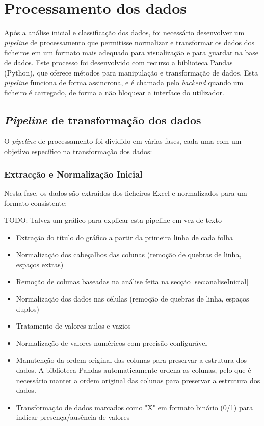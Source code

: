 \section{Processamento dos dados}

Após a análise inicial e classificação dos dados, foi necessário desenvolver um \textit{pipeline} de processamento que permitisse normalizar e transformar os dados dos ficheiros em um formato mais adequado para visualização e para guardar na base de dados. Este processo foi desenvolvido com recurso a biblioteca Pandas (Python), que oferece métodos para manipulação e transformação de dados. Esta \textit{pipeline} funciona de forma assincrona, e é chamada pelo \textit{backend} quando um ficheiro é carregado, de forma a não bloquear a interface do utilizador.

\subsection{\textit{Pipeline} de transformação dos dados}

O \textit{pipeline} de processamento foi dividido em várias fases, cada uma com um objetivo específico na transformação dos dados:

\subsubsection{Extracção e Normalização Inicial}

Nesta fase, os dados são extraídos dos ficheiros Excel e normalizados para um formato consistente:

TODO: Talvez um gráfico para explicar esta pipeline em vez de texto

\begin{itemize}
    \item Extração do título do gráfico a partir da primeira linha de cada folha
    \item Normalização dos cabeçalhos das colunas (remoção de quebras de linha, espaços extras)
    \item Remoção de colunas baseadas na análise feita na secção \ref{sec:analiseInicial}
    \item Normalização dos dados nas células (remoção de quebras de linha, espaços duplos)
    \item Tratamento de valores nulos e vazios
    \item Normalização de valores numéricos com precisão configurável
    \item Manutenção da ordem original das colunas para preservar a estrutura dos dados. A biblioteca Pandas automaticamente ordena as colunas, pelo que é necessário manter a ordem original das colunas para preservar a estrutura dos dados.
    \item Transformação de dados marcados como "X" em formato binário (0/1) para indicar presença/ausência de valores
\end{itemize}

